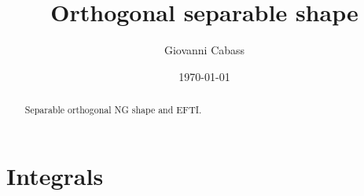 \documentclass[aps,prd,amsmath,floats,floatfix,superscriptaddress,nofootinbib%
]{revtex4}%
\renewcommand\({\left(}
\renewcommand\){\right)}
\renewcommand\[{\left[}
\renewcommand\]{\right]}
\begin{document}
\title{Orthogonal separable shape}

\author{Giovanni Cabass}

\date{\today}
\begin{abstract}
\noindent Separable orthogonal NG shape and EFTI. 
\end{abstract}

\maketitle




\tableofcontents




\section{Integrals}
\label{sec:integrals}
\end{document}
